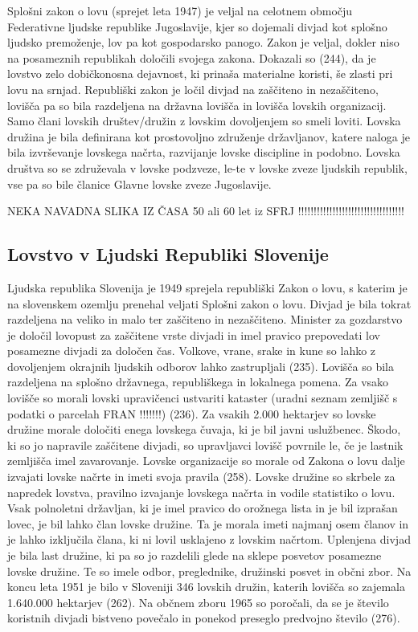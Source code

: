\documentclass[a4paper,12pt,openright]{book}
\begin{document}
Splošni zakon o lovu (sprejet leta 1947) je veljal na celotnem območju Federativne ljudske republike Jugoslavije, kjer so dojemali divjad kot splošno ljudsko premoženje, lov pa kot gospodarsko panogo. 
Zakon je veljal, dokler niso na posameznih republikah določili svojega zakona.
Dokazali so (244), da je lovstvo zelo dobičkonosna dejavnost, ki prinaša materialne koristi, še zlasti pri lovu na srnjad.
Republiški zakon je ločil divjad na zaščiteno in nezaščiteno, lovišča pa so bila razdeljena na državna lovišča in lovišča lovskih organizacij.
Samo člani lovskih društev/družin z lovskim dovoljenjem so smeli loviti. 
Lovska družina je bila definirana kot prostovoljno združenje državljanov, katere naloga je bila izvrševanje lovskega načrta, razvijanje lovske discipline in podobno. 
Lovska društva so se združevala v lovske podzveze, le-te v lovske zveze ljudskih republik, vse pa so bile članice Glavne lovske zveze Jugoslavije. \cite{Lov_235_244}

NEKA NAVADNA SLIKA IZ ČASA 50 ali 60 let iz SFRJ !!!!!!!!!!!!!!!!!!!!!!!!!!!!!!!!!!

\subsection{Lovstvo v Ljudski Republiki Slovenije}

Ljudska republika Slovenija je 1949 sprejela republiški Zakon o lovu, s katerim je na slovenskem ozemlju prenehal veljati Splošni zakon o lovu.
Divjad je bila tokrat razdeljena na veliko in malo ter zaščiteno in nezaščiteno. 
Minister za gozdarstvo je določil lovopust za zaščitene vrste divjadi in imel pravico prepovedati lov posamezne divjadi za določen čas. 
Volkove, vrane, srake in kune so lahko z dovoljenjem okrajnih ljudskih odborov lahko zastrupljali (235).
Lovišča so bila razdeljena na splošno državnega, republiškega in lokalnega pomena. 
Za vsako lovišče so morali lovski upravičenci ustvariti kataster (uradni seznam zemljišč s podatki o parcelah FRAN !!!!!!!) (236). 
Za vsakih 2.000 hektarjev so lovske družine morale določiti enega lovskega čuvaja, ki je bil javni uslužbenec. 
Škodo, ki so jo napravile zaščitene divjadi, so upravljavci lovišč povrnile le, če je lastnik zemljišča imel zavarovanje.  
Lovske organizacije so morale od Zakona o lovu dalje izvajati lovske načrte in imeti svoja pravila (258). 
Lovske družine so skrbele za napredek lovstva, pravilno izvajanje lovskega načrta in vodile statistiko o lovu. 
Vsak polnoletni državljan, ki je imel pravico do orožnega lista in je bil izprašan lovec, je bil lahko član lovske družine. 
Ta je morala imeti najmanj osem članov in je lahko izključila člana, ki ni lovil usklajeno z lovskim načrtom. 
Uplenjena divjad je bila last družine, ki pa so jo razdelili glede na sklepe posvetov posamezne lovske družine. 
Te so imele odbor, preglednike, družinski posvet in občni zbor. 
Na koncu leta 1951 je bilo v Sloveniji 346 lovskih družin, katerih lovišča so zajemala 1.640.000 hektarjev (262).
Na občnem zboru 1965 so poročali, da se je število koristnih divjadi bistveno povečalo in ponekod preseglo predvojno število (276). \cite{Lov_258_276}
\end{document}
